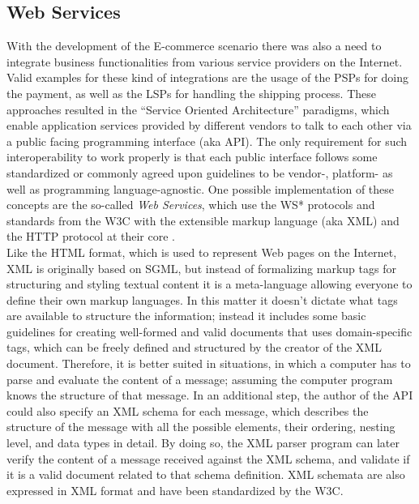 
\subsection{Web Services}
\label{subsec:web_services}

With the development of the \gls{E-commerce} scenario there was also a need to integrate business functionalities from various service providers on the Internet. Valid examples for these kind of integrations are the usage of the \gls{PSP}s for doing the payment, as well as the \gls{LSP}s for handling the shipping process. These approaches resulted in the ``Service Oriented Architecture'' paradigms, which enable application services provided by different vendors to talk to each other via a public facing programming interface (aka \gls{API}). The only requirement for such interoperability to work properly is that each public interface follows some standardized or commonly agreed upon guidelines to be vendor-, platform- as well as programming language-agnostic. One possible implementation of these concepts are the so-called \emph{Web Services}, which use the WS* protocols and standards from the \gls{W3C} with the extensible markup language (aka \gls{XML}) and the \gls{HTTP} protocol at their core \citep{josuttis2007soa}. \\

Like the \gls{HTML} format, which is used to represent Web pages on the Internet, \gls{XML} is originally based on \gls{SGML}, but instead of formalizing markup tags for structuring and styling textual content it is a meta-language allowing everyone to define their own markup languages. In this matter it doesn’t dictate what tags are available to structure the information; instead it includes some basic guidelines for creating well-formed and valid documents that uses domain-specific tags, which can be freely defined and structured by the creator of the \gls{XML} document. Therefore, it is better suited in situations, in which a computer has to parse and evaluate the content of a message; assuming the computer program knows the structure of that message. In an additional step, the author of the \gls{API} could also specify an \gls{XML} schema for each message, which describes the structure of the message with all the possible elements, their ordering, nesting level, and data types in detail. By doing so, the \gls{XML} parser program can later verify the content of a message received against the \gls{XML} schema, and validate if it is a valid document related to that schema definition. \gls{XML} schemata are also expressed in \gls{XML} format and have been standardized by the \gls{W3C}. \\

